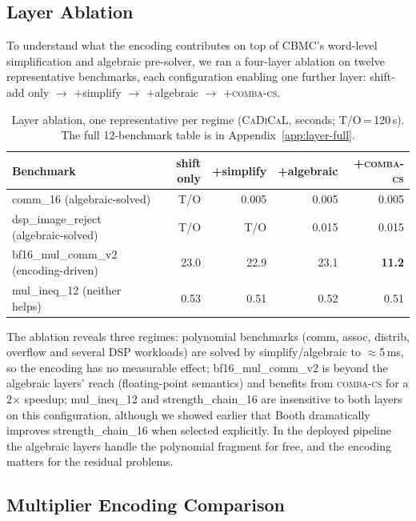 \documentclass[a4paper]{ceurart}
\newcommand{\combacs}{\textsc{comba-cs}\xspace}
\newcommand{\cadical}{\textsc{CaDiCaL}\xspace}
\newcommand{\cbmc}{\textsc{CBMC}\xspace}
\begin{document}
\subsection{Layer Ablation}
\label{sec:ablation}

To understand what the encoding contributes on top of \cbmc's
word-level simplification and algebraic pre-solver, we ran a
four-layer ablation on twelve representative benchmarks, each
configuration enabling one further layer: shift-add only $\to$
$+$simplify $\to$ $+$algebraic $\to$ $+$\combacs.

\begin{table}[ht]
\caption{Layer ablation, one representative per regime (\cadical,
  seconds; T/O\,=\,120\,s). The full 12-benchmark table is in
  Appendix~\ref{app:layer-full}.}
\label{tab:ablation}
\centering
\small
\begin{tabular}{lrrrr}
\toprule
Benchmark & shift only & +simplify & +algebraic & +\combacs \\
\midrule
comm\_16  (algebraic-solved)            & T/O  & 0.005 & 0.005 & 0.005 \\
dsp\_image\_reject (algebraic-solved)   & T/O  & T/O   & 0.015 & 0.015 \\
bf16\_mul\_comm\_v2 (encoding-driven)   & 23.0 & 22.9  & 23.1  & \textbf{11.2} \\
mul\_ineq\_12 (neither helps)           & 0.53 & 0.51  & 0.52  & 0.51 \\
\bottomrule
\end{tabular}
\end{table}

The ablation reveals three regimes: polynomial benchmarks (comm,
assoc, distrib, overflow and several DSP workloads) are solved by
simplify/algebraic to ${\approx}$5\,ms, so the encoding has no
measurable effect; bf16\_mul\_comm\_v2 is beyond the algebraic
layers' reach (floating-point semantics) and benefits from
\combacs for a 2$\times$ speedup; mul\_ineq\_12 and
strength\_chain\_16 are insensitive to both layers on this
configuration, although we showed earlier that Booth dramatically
improves strength\_chain\_16 when selected explicitly. In the
deployed pipeline the algebraic layers handle the polynomial
fragment for free, and the encoding matters for the residual
problems.

\subsection{Multiplier Encoding Comparison}
\end{document}
